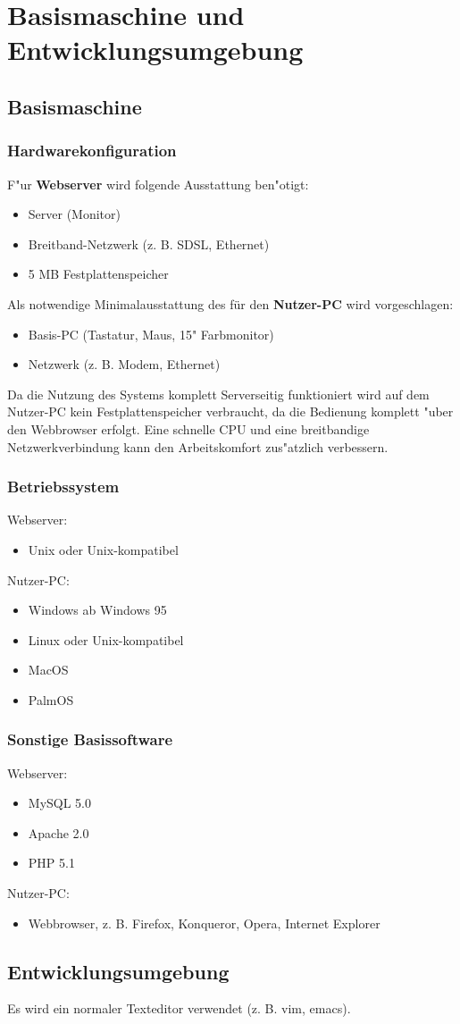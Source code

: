 \chapter{Basismaschine und Entwicklungsumgebung}
\section{Basismaschine}
\subsection{Hardwarekonfiguration}
F"ur {\bf Webserver} wird folgende Ausstattung ben"otigt:
\begin{itemize}
 \item Server (Monitor)
 \item Breitband-Netzwerk (z. B. SDSL, Ethernet)
 \item 5 MB Festplattenspeicher
\end{itemize}
Als notwendige Minimalausstattung des für den {\bf Nutzer-PC} wird vorgeschlagen:
\begin{itemize}
 \item Basis-PC (Tastatur, Maus, 15" Farbmonitor)
 \item Netzwerk (z. B. Modem, Ethernet)
\end{itemize}
Da die Nutzung des Systems komplett Serverseitig funktioniert wird auf dem Nutzer-PC kein Festplattenspeicher verbraucht, da die
Bedienung komplett "uber den Webbrowser erfolgt. Eine schnelle CPU und eine breitbandige Netzwerkverbindung
kann den Arbeitskomfort zus"atzlich verbessern.


\subsection{Betriebssystem}
Webserver:
\begin{itemize}
\item Unix oder Unix-kompatibel
\end{itemize}
Nutzer-PC:
\begin{itemize}
\item Windows ab Windows 95
\item Linux oder Unix-kompatibel
\item MacOS
\item PalmOS
\end{itemize}

\subsection{Sonstige Basissoftware}
Webserver:
\begin{itemize}
\item MySQL 5.0
\item Apache 2.0
\item PHP 5.1
\end{itemize}
Nutzer-PC:
\begin{itemize}
\item Webbrowser, z. B. Firefox, Konqueror, Opera, Internet Explorer
\end{itemize}


\section{Entwicklungsumgebung}
Es wird ein normaler Texteditor verwendet (z. B. vim, emacs).
